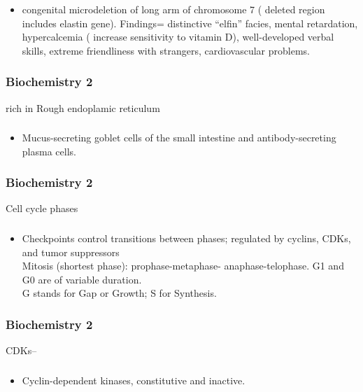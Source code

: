 \documentclass[11pt]{beamer}
\begin{document}
\begin{frame}
 \frametitle{}
\begin{itemize}
\item congenital microdeletion of long arm of chromosome 7 ( deleted region includes elastin gene). Findings= distinctive “elfin” facies, mental retardation, hypercalcemia ( increase sensitivity to vitamin D), well-developed verbal skills, extreme friendliness with strangers, cardiovascular problems. 
\end{itemize}
\end{frame}

\begin{frame}
 \frametitle{Biochemistry 2}
rich in Rough endoplamic reticulum 
\end{frame}

\begin{frame}
 \frametitle{}
\begin{itemize}
\item Mucus-secreting goblet cells of the small intestine and antibody-secreting plasma cells. 
\end{itemize}
\end{frame}

\begin{frame}
 \frametitle{Biochemistry 2}
Cell cycle phases
\end{frame}

\begin{frame}
 \frametitle{}
\begin{itemize}
\item Checkpoints control transitions between phases; regulated by cyclins, CDKs, and tumor suppressors \\ Mitosis (shortest phase): prophase-metaphase- anaphase-telophase. G1 and G0 are of variable duration. \\ G stands for Gap or Growth; S for Synthesis.
\end{itemize}
\end{frame}

\begin{frame}
 \frametitle{Biochemistry 2}
CDKs–
\end{frame}

\begin{frame}
 \frametitle{}
\begin{itemize}
\item Cyclin-dependent kinases, constitutive and inactive. 
\end{itemize}
\end{frame}
\end{document}
